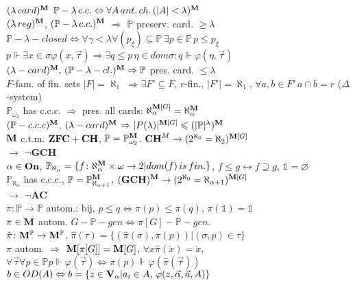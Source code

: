 \documentclass[9pt]{article}
\newcommand{\class}[1]{{\bf #1}}
\newcommand{\Pp}{\mathbb{P}}
\newcommand{\mytitle}[1]{ {\bf $\rightarrow$ #1}\\}
\newcommand{\On}{\class{On}}
\newcommand{\V}{\class{V}}
\newcommand{\M}{\class{M}}
\begin{document}
\begin{multicols*}{2}
$(\lambda\,card)^\M$ $\Pp-\lambda\,c.c.\Leftrightarrow\forall A\,ant.\,ch.\, (|A|<\lambda)^\M$\\
$(\lambda\,reg)^\M$, $(\Pp-\lambda\,c.c.)^\M$ $\Rightarrow$ $\Pp$ preserv. card. $\geqslant\lambda$\\
$\Pp-\lambda-closed\Leftrightarrow\forall\gamma<\lambda\forall (p_\xi)\subseteq\Pp\,\exists p\in \Pp\,p\leqslant p_\xi$\\
$p\Vdash\exists x\in\sigma \varphi(x,\vec{\tau})\Rightarrow\exists q\leqslant p\,\eta\in dom\sigma\colon q\Vdash \varphi(\eta,\vec{\tau})$\\
$(\lambda-card)^\M,\,(\Pp-\lambda-cl.)^\M\Rightarrow\Pp$ pres. card. $\leqslant\lambda$\\
$F$-fam. of fin. sets $|F|=\aleph_1$ $\Rightarrow\exists F'\subseteq F$, $r$-fin., $|F'|=\aleph_1$, $\forall a, b\in F'\,a\cap b=r$ ($\Delta$-system)\\
$\Pp_{\omega_2}$ has c.c.c. $\Rightarrow$ pres. all cards: $\aleph_\alpha^{\M[G]}=\aleph_\alpha^\M$\\
$(\Pp-c.c.c)^\M$, $(\lambda-card)^\M$ $\Rightarrow|P(\lambda)|^{\M[G]}\leqslant(|\Pp|^\lambda)^\M$\\
$\M$ c.t.m. $\class{ZFC}+\class{CH}$, $\Pp=\Pp_{\omega_2}^\M$. $\class{CH}^M\to(2^{\aleph_0}=\aleph_2)^{\M[G]}$\\
\mytitle{$\neg$\class{GCH}}
$\alpha\in\On$, $\Pp_{\aleph_\alpha}=\{f\colon\aleph_\alpha^\M\times\omega\to2|dom(f)\,is\,fin.\}$, $f\leqslant g\leftrightarrow f\supseteq g,\,\mathbb{1}=\varnothing$\\
$\Pp_{\aleph_\alpha}$ has c.c.c., $\Pp=\Pp_{\aleph_{\alpha+1}}^\M$, $(\class{GCH})^\M\to(2^{\aleph_0}=\aleph_{\alpha+1})^{\M[G]}$\\
\mytitle{$\neg$\class{AC}}
$\pi\colon \Pp\to\Pp$ autom.: bij, $p\leqslant q\Leftrightarrow \pi(p)\leqslant \pi(q)$, $\pi(\mathbb{1})=\mathbb{1}$\\
$\pi\in \M$ autom. $G-\Pp-gen\Leftrightarrow\pi[G]-\Pp-gen.$\\
$\hat{\pi}\colon \M^\Pp\to\M^\Pp$, $\hat{\pi}(\tau)=\{(\hat{\pi}(\sigma),\pi(p))|(\sigma,p)\in\tau\}$\\
$\pi$ autom. $\Rightarrow$ $\M[\pi[G]]=\M[G]$, $\forall x\hat{\pi}(\check{x})=\check{x}$, $\forall\vec{\tau}\forall p\in\Pp p\Vdash\varphi(\vec{\tau})\Leftrightarrow\pi(p)\Vdash\varphi(\hat{\pi}(\vec{\tau}))$\\
$b\in OD(A)\Leftrightarrow b=\{z\in \V_\alpha |a_i\in A,\,\varphi(z,\vec{\alpha},\vec{a},A)\}$\\

\end{multicols*}
\end{document}
